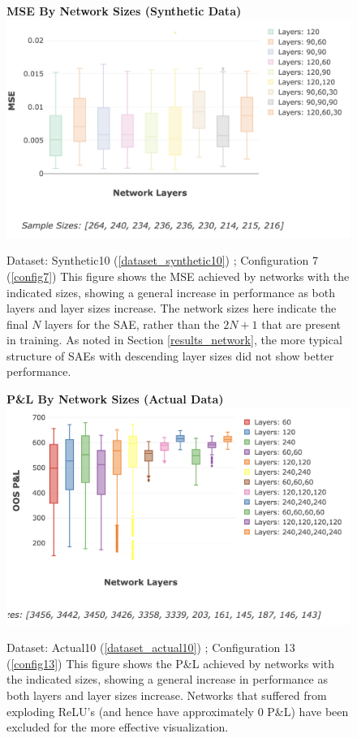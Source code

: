 \documentclass[a4paper,11pt,oneside]{article}
\theoremstyle{plain}
\theoremstyle{definition}
\begin{document}
	\begin{figure}[H]
		\centering 
		\textbf{MSE By Network Sizes (Synthetic Data)}
		\includegraphics[scale=0.4]{images/results/8_appendix/synth_mse_box.png} 
		\caption[MSE By Network Sizes (Synthetic Data)]{Dataset: Synthetic10 (\ref{dataset_synthetic10}) ; Configuration 7 (\ref{config7})
			\newline This figure shows the MSE achieved by networks with the indicated sizes, showing a general increase in performance as both layers and layer sizes increase. The network sizes here indicate the final $N$ layers for the SAE, rather than the $2N + 1$ that are present in training. As noted in Section \ref{results_network}, the more typical structure of SAEs with descending layer sizes did not show better performance.}
		\label{figure-synth_mse_box}
	\end{figure}
	
	\begin{figure}[H]
		\centering 
		\textbf{P\&L By Network Sizes (Actual Data)}
		\includegraphics[scale=0.4]{images/results/8_appendix/actual_pl_box.png} 
		\caption[P\&L By Network Sizes (Actual Data)]{Dataset: Actual10 (\ref{dataset_actual10}) ; Configuration 13 (\ref{config13})
			\newline This figure shows the P\&L achieved by networks with the indicated sizes, showing a general increase in performance as both layers and layer sizes increase. Networks that suffered from exploding ReLU's (and hence have approximately 0 P\&L) have been excluded for the more effective visualization. }
		\label{figure-results_actual_pl_box}
	\end{figure}
	
\end{document}
